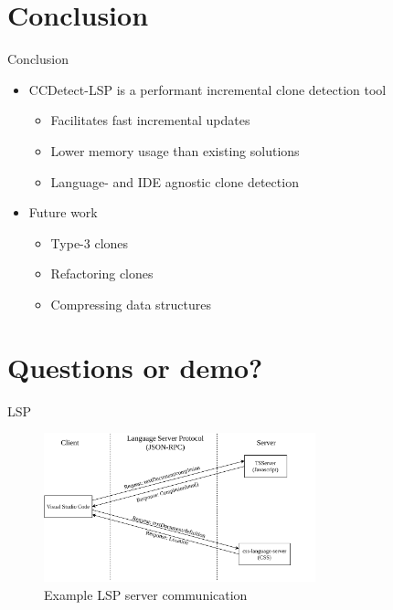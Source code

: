 \documentclass[aspectratio=1610, xcolor=table]{beamer}
\begin{document}
\section{Conclusion}
\begin{frame}{Conclusion}
	\begin{itemize}
        \item CCDetect-LSP is a performant incremental clone detection tool
            \begin{itemize}
                \item Facilitates fast incremental updates
                \item Lower memory usage than existing solutions
                \item Language- and IDE agnostic clone detection
            \end{itemize}
		\item Future work
            \begin{itemize}
                \item Type-3 clones
                \item Refactoring clones
                \item Compressing data structures
            \end{itemize}
	\end{itemize}
\end{frame}

\section{Questions or demo?}

\begin{frame}{LSP}
    \begin{figure}
        \begin{center}
            \includegraphics[width=0.7\textwidth]{figures/lspcommunication.drawio.pdf}
        \end{center}
        \caption{Example LSP server communication}
    \end{figure}
\end{frame}
\end{document}
